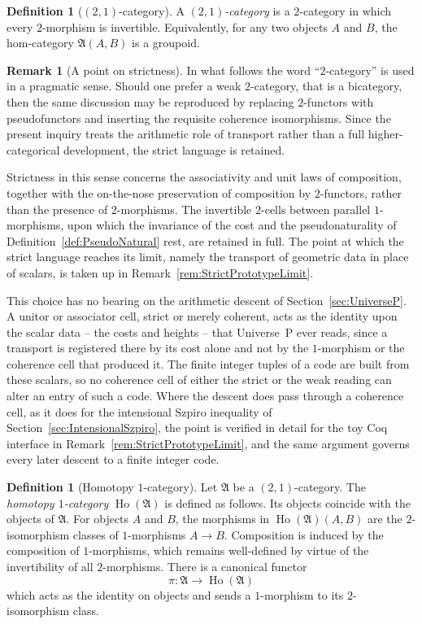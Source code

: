 \documentclass[10pt, reqno]{amsart}
\theoremstyle{plain}
\theoremstyle{definition}
\newtheorem{definition}[theorem]{Definition}
\newtheorem{remark}[theorem]{Remark}
\theoremstyle{plain}
\newcommand{\Ho}{\operatorname{Ho}}
\begin{document}
\begin{definition}[$(2,1)$-category]\label{def:TwoOneCategory}
A \emph{$(2,1)$-category} is a $2$-category in which every $2$-morphism is invertible. Equivalently, for any two objects $A$ and $B$, the hom-category $\mathfrak{A}(A,B)$ is a groupoid.
\end{definition}

\begin{remark}[A point on strictness]\label{rem:strictness}
In what follows the word ``$2$-category'' is used in a pragmatic sense. Should one prefer a weak $2$-category, that is a bicategory, then the same discussion may be reproduced by replacing $2$-functors with pseudofunctors and inserting the requisite coherence isomorphisms. Since the present inquiry treats the arithmetic role of transport rather than a full higher-categorical development, the strict language is retained.

Strictness in this sense concerns the associativity and unit laws of composition, together with the on-the-nose preservation of composition by $2$-functors, rather than the presence of $2$-morphisms. The invertible $2$-cells between parallel $1$-morphisms, upon which the invariance of the cost and the pseudonaturality of Definition~\ref{def:PseudoNatural} rest, are retained in full. The point at which the strict language reaches its limit, namely the transport of geometric data in place of scalars, is taken up in Remark~\ref{rem:StrictPrototypeLimit}.

This choice has no bearing on the arithmetic descent of Section~\ref{sec:UniverseP}. A unitor or associator cell, strict or merely coherent, acts as the identity upon the scalar data -- the costs and heights -- that Universe~P ever reads, since a transport is registered there by its cost alone and not by the $1$-morphism or the coherence cell that produced it. The finite integer tuples of a code are built from these scalars, so no coherence cell of either the strict or the weak reading can alter an entry of such a code. Where the descent does pass through a coherence cell, as it does for the intensional Szpiro inequality of Section~\ref{sec:IntensionalSzpiro}, the point is verified in detail for the toy Coq interface in Remark~\ref{rem:StrictPrototypeLimit}, and the same argument governs every later descent to a finite integer code.
\end{remark}

\begin{definition}[Homotopy $1$-category]\label{def:HoOneCategory}
Let $\mathfrak{A}$ be a $(2,1)$-category. The \emph{homotopy $1$-category} $\Ho(\mathfrak{A})$ is defined as follows. Its objects coincide with the objects of $\mathfrak{A}$. For objects $A$ and $B$, the morphisms in $\Ho(\mathfrak{A})(A,B)$ are the $2$-isomorphism classes of $1$-morphisms $A \to B$. Composition is induced by the composition of $1$-morphisms, which remains well-defined by virtue of the invertibility of all $2$-morphisms. There is a canonical functor
\[
  \pi \colon \mathfrak{A} \longrightarrow \Ho(\mathfrak{A})
\]
which acts as the identity on objects and sends a $1$-morphism to its $2$-isomorphism class.
\end{definition}
\end{document}
